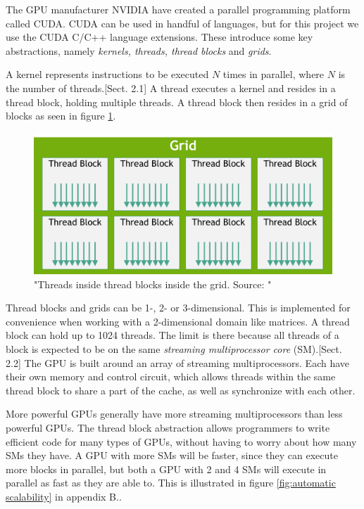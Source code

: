 \noindent The GPU manufacturer NVIDIA have created a parallel programming platform called CUDA. CUDA can be used in handful of languages, but for this project we use the CUDA C/C++ language extensions. These introduce some key abstractions, namely \textit{kernels, threads, thread blocks} and \textit{grids}. 

A kernel represents instructions to be executed $N$ times in parallel, where $N$ is the number of threads.[Sect. 2.1]\cite{nvidia:cudadoc} A thread executes a kernel and resides in a thread block, holding multiple threads. A thread block then resides in a grid of blocks as seen in figure \ref{fig:threads and blocks.}.

\begin{figure}[ht]
\includegraphics[width=\textwidth]{Documents/Report/Figures/Threads and blocks.png}
\caption{"Threads inside thread blocks inside the grid. Source: \cite[Figure 4]{nvidia:cudadoc}"}
\label{fig:threads and blocks.}
\end{figure}

Thread blocks and grids can be 1-, 2- or 3-dimensional. This is implemented for convenience when working with a 2-dimensional domain like matrices. A thread block can hold up to 1024 threads. The limit is there because all threads of a block is expected to be on the same \textit{streaming multiprocessor core} (SM).[Sect. 2.2]\cite{nvidia:cudadoc} The GPU is built around an array of streaming multiprocessors. Each have their own memory and control circuit, which allows threads within the same thread block to share a part of the cache, as well as synchronize with each other. 

More powerful GPUs generally have more streaming multiprocessors than less powerful GPUs. The thread block abstraction allows programmers to write efficient code for many types of GPUs, without having to worry about how many SMs they have. A GPU with more SMs will be faster, since they can execute more blocks in parallel, but both a GPU with 2 and 4 SMs will execute in parallel as fast as they are able to. This is illustrated in figure \ref{fig:automatic scalability} in appendix B.\cite[Sect. 1.3]{nvidia:cudadoc}.\\

